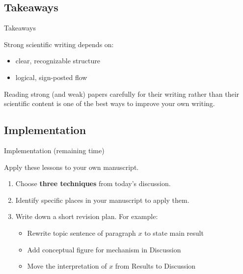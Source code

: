 \documentclass{beamer}
\begin{document}
\subsection{Takeaways}
\begin{frame}{Takeaways}

Strong scientific writing depends on:

\begin{itemize}
\item clear, recognizable structure
\item logical, sign-posted flow
\end{itemize}

\vspace{0.4cm}

Reading strong (and weak) papers carefully for their writing rather than their scientific content
is one of the best ways to improve your own writing.

\end{frame}
\subsection{Implementation}
\begin{frame}{Implementation (remaining time)}

Apply these lessons to your own manuscript.

\begin{enumerate}
    \item  Choose \textbf{three techniques} from today's discussion.
    \item  Identify specific places in your manuscript to apply them.
    \item  Write down a short revision plan. For example:
        \begin{itemize}
            \item Rewrite topic sentence of paragraph $x$ to state main result
            \item Add conceptual figure for mechanism in Discussion
            \item Move the interpretation of $x$ from Results to Discussion
        \end{itemize}
\end{enumerate}

\end{frame}


\end{document}
